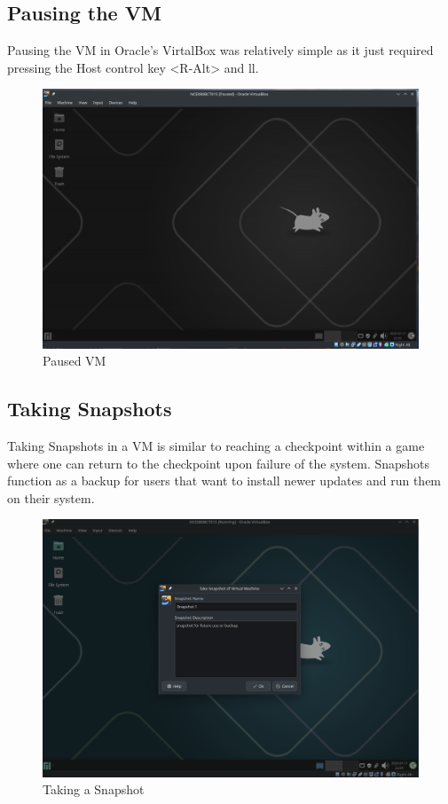\documentclass[a4paper,12pt]{report}
\begin{document}
\subsection{Pausing the VM}
Pausing the VM in Oracle's VirtalBox was relatively simple as it just required pressing the Host control key <R-Alt> and ll. 
\begin{figure}[h]
    \centering
    \includegraphics[width=0.7\linewidth]{pause.png}
    \caption{Paused VM}
    \label{fig22}
\end{figure}
\newpage
\subsection{Taking Snapshots}
Taking Snapshots in a VM is similar to reaching a checkpoint within a game where one can return to the checkpoint upon failure of the system. Snapshots function as a backup for users that want to install newer updates and run them on their system.
\begin{figure}[h]
    \centering
    \includegraphics[width=0.7\linewidth]{snapshot.png}
    \caption{Taking a Snapshot}
    \label{fig23}
\end{figure}
\end{document}

